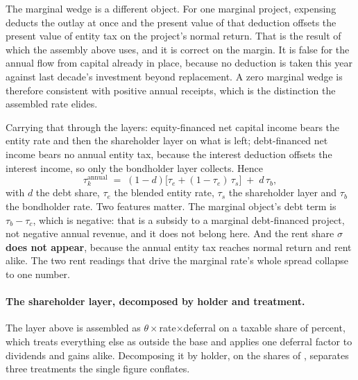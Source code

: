 The marginal wedge is a different object. For one marginal project, expensing deducts the outlay
at once and the present value of that deduction offsets the present value of entity tax on the
project's normal return. That is the result of \citet{AcemogluManeraRestrepo2020} which the
assembly above uses, and it is correct on the margin. It is false for the annual flow from
capital already in place, because no deduction is taken this year against last decade's
investment beyond replacement. A zero marginal wedge is therefore consistent with positive
annual receipts, which is the distinction the assembled rate elides.

Carrying that through the layers: equity-financed net capital income bears the entity rate and
then the shareholder layer on what is left; debt-financed net income bears no annual entity tax,
because the interest deduction offsets the interest income, so only the bondholder layer
collects. Hence
\begin{equation}
\tau_k^{\text{annual}} \;=\; (1-d)\bigl[\tau_e + (1-\tau_e)\,\tau_s\bigr] \;+\; d\,\tau_b ,
\label{eq:annual}
\end{equation}
with $d$ the debt share, $\tau_e$ the blended entity rate, $\tau_s$ the shareholder layer and
$\tau_b$ the bondholder rate. Two features matter. The marginal object's debt term is
$\tau_b-\tau_c$, which is negative: that is a subsidy to a marginal debt-financed project, not
negative annual revenue, and it does not belong here. And the rent share $\sigma$ \textbf{does
not appear}, because the annual entity tax reaches normal return and rent alike. The two rent
readings that drive the marginal rate's whole spread collapse to one number.

\paragraph{The shareholder layer, decomposed by holder and treatment.} The layer above is
assembled as $\theta\times$rate$\times$deferral on a taxable share of 
percent, which treats everything else as outside the base and applies one deferral factor to
dividends and gains alike. Decomposing it by holder, on the shares of
\citet{RosenthalMucciolo2024}, separates three treatments the single figure conflates.

